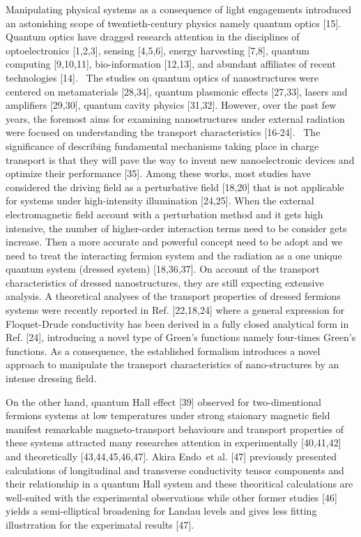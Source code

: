 Manipulating physical systems as a consequence of light engagements introduced an astonishing scope of twentieth-century physics namely quantum optics [15].
Quantum optics have dragged research attention in the disciplines of optoelectronics [1,2,3], sensing [4,5,6], energy harvesting [7,8], quantum computing [9,10,11], bio-information [12,13], and abundant affiliates of recent technologies [14]. 
The studies on quantum optics of nanostructures were centered on metamaterials [28,34], quantum plasmonic effects [27,33], lasers and amplifiers [29,30], quantum cavity physics [31,32]. However, over the past few years, the foremost aims for examining nanostructures under external radiation were focused on understanding the transport characteristics [16-24]. 
The significance of describing fundamental mechanisms taking place in charge transport is that they will pave the way to invent new nanoelectronic devices and optimize their performance [35].
Among these works, most studies have considered the driving field as a perturbative field [18,20] that is not applicable for systems under high-intensity illumination [24,25]. When the external electromagnetic field account with a perturbation method and it gets high intensive, the number of higher-order interaction terms need to be consider gets increase. Then a more accurate and powerful concept need to be adopt and we need to treat the interacting fermion system and the radiation as a one unique quantum system (dressed system) [18,36,37]. On account of the transport characteristics of dressed nanostructures, they are still expecting extensive analysis.
A theoretical analyses of the transport properties of dressed fermions systems were recently reported in Ref. [22,18,24] where a general expression for Floquet-Drude conductivity has been derived in a fully closed analytical form in Ref. [24], introducing a novel type of Green’s functions namely four-times Green’s functions. As a consequence, the established formalism introduces a novel approach to manipulate the transport characteristics of nano-structures by an intense dressing field.

On the other hand, quantum Hall effect [39] observed for two-dimentional fermions systems at low temperatures under strong staionary magnetic field manifest remarkable magneto-transport behaviours and transport properties of these systems attracted many researches attention in experimentally [40,41,42] and theoretically [43,44,45,46,47]. Akira Endo et al. [47] previously presented calculations of longitudinal and transverse conductivity tensor components and their relationship in a quantum Hall system and these theoritical calculations are well-suited with the experimental observations while other former studies [46] yields a semi-elliptical broadening for Landau levels and gives less fitting illustrration for the experimatal results [47].

